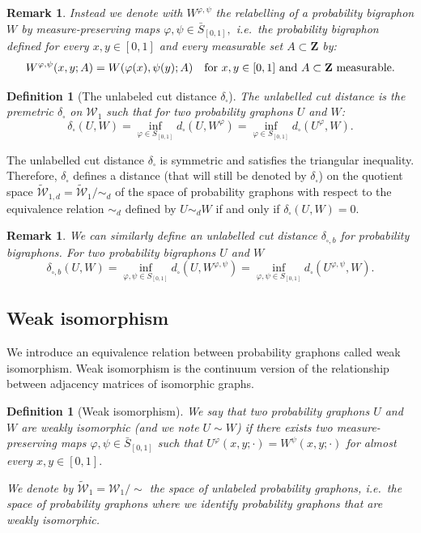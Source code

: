 \documentclass[11pt]{article}
\newtheorem{definition}[theorem]{Definition}
\newtheorem{remark}[theorem]{Remark}
\newcommand{\Space}{\mathbf{Z}}
\newcommand{\Graphon}{\mathcal{W}_1}
\newcommand{\UGraphon}{\widetilde{\mathcal{W}}_1}
\newcommand{\UGraphond}{\widetilde{\mathcal{W}}_{1,d}}
\newcommand{\InvRelabel}{S_{[0,1]}}
\newcommand{\Relabel}{\bar{S}_{[0,1]}}
\newcommand{\simd}{\sim_{d}}
\newcommand{\dd}{\delta_{\square}}
\begin{document}
\begin{remark}
Instead we denote with $W^{\varphi,\psi}$ the relabelling of a probability bigraphon $W$ by measure-preserving maps $\varphi,\psi \in \Relabel,$ i.e.\ the probability bigraphon defined for every $x,y\in [0,1]$ and every measurable set $A\subset \Space$ by:
\[
  W^{\varphi,\psi}(x,y;A) = W(\varphi(x),\psi(y);A)
  \quad \text{for $x,y\in [0,1]$ and $ A\subset \Space$ measurable}.
\]

\end{remark}
\begin{definition}[The unlabeled cut distance $\delta_{\square}$]\label{def:ddcut}
 The \emph{unlabelled cut distance} is the premetric $\dd$ on $\Graphon$ such that for two probability graphons $U$ and $W$:
\begin{equation}\label{def_ddcut}
\dd(U,W) = \inf_{\varphi\in\InvRelabel} d_{\square}(U,W^\varphi)	
= \inf_{\varphi\in\InvRelabel} d_{\square}\left(U^{\varphi},W\right)		 .\end{equation}
\end{definition}

The unlabelled cut distance  $\dd$ is symmetric and satisfies the triangular inequality.  Therefore, $\dd$ defines a distance (that will still be denoted by $\dd $) on the quotient space $\UGraphond = \UGraphon / \simd$ of the space of probability graphons with respect to the equivalence relation $\simd$ defined by $U\simd W$  if and only if  $\dd(U,W)=0$.

\begin{remark}\label{RKBigraphonsDistance}
We can similarly define an unlabelled cut distance $\delta_{\square,b}$ for probability bigraphons. For two probability bigraphons $U$ and $W$ 
$$
\delta_{\square,b}(U,W)= \inf_{\varphi,\psi\in\InvRelabel} d_{\square}(U,W^{\varphi,\psi})	
= \inf_{\varphi,\psi\in\InvRelabel} d_{\square}\left(U^{\varphi,\psi},W\right).	
$$
\end{remark}

\subsection{Weak isomorphism}
\label{section_weak_isomorphism}

We introduce an equivalence relation between probability graphons called weak isomorphism. Weak isomorphism is the continuum version of the relationship between adjacency matrices of isomorphic graphs. 

\begin{definition}[Weak isomorphism]\label{def_weak_isomorphism}
We say that two probability graphons $U$ and $W$ are \emph{weakly isomorphic}
(and we note $U\sim W$) if there exists two measure-preserving maps $\varphi, \psi\in\Relabel$
such that $U^\varphi(x,y; \cdot) = W^\psi(x,y;\cdot)$ for almost every $x,y\in [0,1].$

We denote by $\UGraphon=\Graphon / \sim$ the space of unlabeled probability graphons, i.e.\
the space of probability graphons where we identify probability graphons that are weakly
isomorphic. 
\end{definition}
\end{document}
